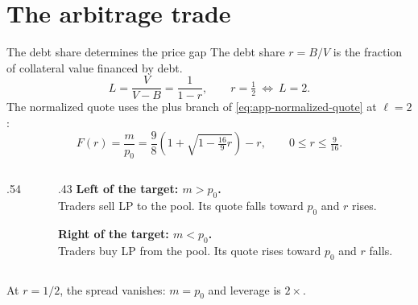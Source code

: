 \documentclass[aspectratio=169,11pt]{beamer}
\begin{document}
\section{The arbitrage trade}
\begin{frame}{The debt share determines the price gap}
  The debt share $r=B/V$ is the fraction of collateral value financed by debt.
  \begin{equation}\label{eq:debt-share}
    L=\frac{V}{V-B}=\frac{1}{1-r},
    \qquad r=\tfrac12\ \Longleftrightarrow\ L=2.
  \end{equation}
  The normalized quote uses the plus branch of \eqref{eq:app-normalized-quote} at $\ell=2$:
  \begin{equation}\label{eq:normalized-quote}
    F(r)=\frac{m}{p_0}=\frac98\!\left(1+\sqrt{1-\tfrac{16}{9}r}\right)-r,
    \qquad 0\le r\le\tfrac{9}{16}.
  \end{equation}
  \begin{columns}[c,onlytextwidth]
    \begin{column}{.54\textwidth}
      \centering
    \end{column}
    \begin{column}{.43\textwidth}
      \textbf{Left of the target: $m>p_0$.}\\
      Traders sell LP to the pool. Its quote falls toward $p_0$ and $r$ rises.

      \medskip
      \textbf{Right of the target: $m<p_0$.}\\
      Traders buy LP from the pool. Its quote rises toward $p_0$ and $r$ falls.
    \end{column}
  \end{columns}

  \medskip
  \centering At $r=1/2$, the spread vanishes: $m=p_0$ and leverage is $2\times$.
\end{frame}
\end{document}
